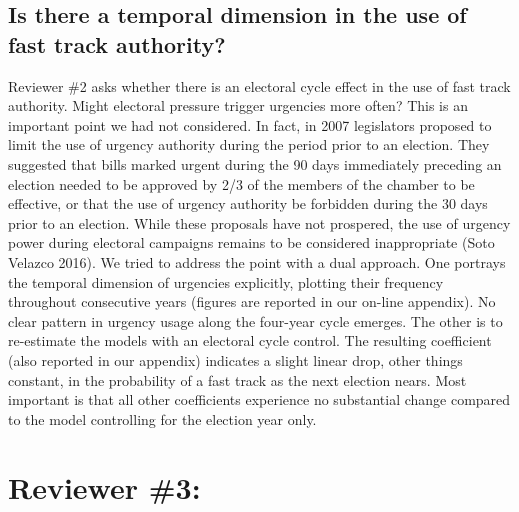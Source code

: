 \documentclass[article,letterpaper,times,12pt,listings-bw,microtype]{article}
\begin{document}
\subsection{Is there a temporal dimension in the use of fast track authority?}
Reviewer \#2 asks whether there is an electoral cycle effect in the use of fast track authority. Might electoral pressure trigger urgencies more often? This is an important point we had not considered. In fact, in 2007 legislators proposed to limit the use of urgency authority during the period prior to an election. They suggested that bills marked urgent during the 90 days immediately preceding an election needed to be approved by 2/3 of the members of the chamber to be effective, or that the use of urgency authority be forbidden during the 30 days prior to an election. While these proposals have not prospered, the use of urgency power during electoral campaigns remains to be considered inappropriate (Soto Velazco 2016). We tried to address the point with a dual approach. One portrays the temporal dimension of urgencies explicitly, plotting their frequency throughout consecutive years (figures are reported in our on-line appendix). No clear pattern in urgency usage along the four-year cycle emerges. The other is to re-estimate the models with an electoral cycle control. The resulting coefficient (also reported in our appendix) indicates a slight linear drop, other things constant, in the probability of a fast track as the next election nears. Most important is that all other coefficients experience no substantial change compared to the model controlling for the election year only.


\section{Reviewer \#3:}
\end{document}
